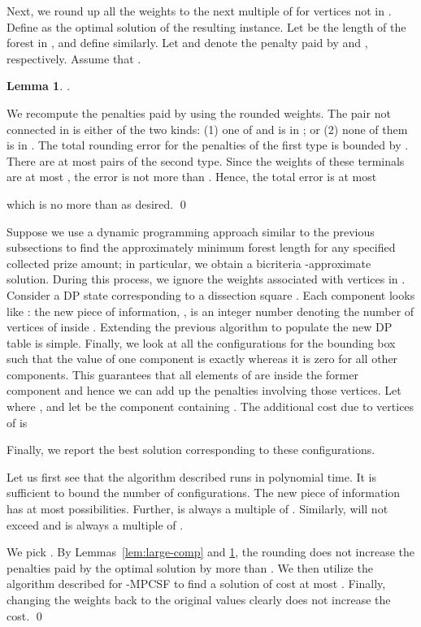 \documentclass[extras,11pt]{article} \usepackage{fullpage}
\theoremstyle{mytheorem}
\newtheorem{lemma}[theorem]{Lemma}
\renewenvironment{proof}{\par\noindent{\bf Proof.}\hspace{0.5em}}
    {\hfill\qed\vspace{1ex}}
\newenvironment{proofof}[1]{\par\noindent{\bf #1.}\hspace{0.5em}}
    {\hfill\qed\vspace{1ex}}
\begin{document}
Next, we round up all the weights to the next multiple of 
for vertices not in .
 Define  as the optimal solution of the resulting instance.
 Let  be the length of the forest in , and define  similarly.
 Let  and  denote the penalty paid by  and , respectively.
Assume that .
\begin{lemma}\label{lem:round-err}
.
\end{lemma}
\begin{proof} We recompute the penalties paid by 
 using the rounded weights.
 The pair  not connected in   is either of the two kinds:
 (1) one of  and  is in ; or (2) none of them is in .
 The total rounding error for the penalties of the first type is bounded by
 .
 There are at most  pairs of the second type.
  Since the weights of these terminals are at most ,
 the error is not more than .
 Hence, the total error is at most

which is no more than  as desired.
\end{proof}






Suppose we use a dynamic programming approach similar to the previous subsections
to find the approximately minimum forest length for any specified collected prize amount;
in particular, we obtain a bicriteria -approximate solution.
During this process, we ignore the weights associated with vertices in .
Consider a DP state  corresponding to a dissection square .
Each component  looks like  :
the new piece of information, , is an integer number denoting the number of
vertices of  inside .
Extending the previous algorithm to populate the new DP table is simple.
Finally, we look at all the configurations  for the bounding box such that
the  value of one component is exactly  whereas it is zero for all other components.
This guarantees that all elements of  are inside the former component and hence
we can add up the penalties involving those vertices.
Let  where ,
and let  be the component containing .
The additional cost due to vertices of  is

Finally, we report the best solution corresponding to these configurations.


\begin{proofof}{\proofname\ of Theorem~\ref{thm:mpcsf}}
Let us first see that the algorithm described runs in polynomial time.
It is sufficient to bound the number of configurations.
The new piece of information has at most  possibilities.
Further,  is always a multiple of .
Similarly,  will not exceed  and is always a multiple of .

 We pick .
  By Lemmas~\ref{lem:large-comp} and \ref{lem:round-err}, the rounding does not increase the penalties paid by the optimal solution by more than .
 We then utilize the algorithm described for -MPCSF to find a solution of cost at most .
Finally,  changing the weights back to the original values clearly does not increase the cost.
\end{proofof}
\end{document}
